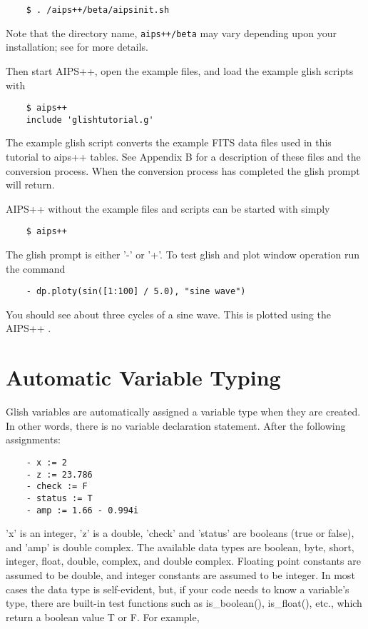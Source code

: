 \begin{verbatim}
	$ . /aips++/beta/aipsinit.sh
\end{verbatim}

Note that the directory name, \verb!aips++/beta!  may vary depending upon your
installation; see  for more details.

Then start AIPS++, open the example files, and load the example glish
scripts with

\begin{verbatim}
	$ aips++
	include 'glishtutorial.g'
\end{verbatim}
The example glish script converts the example FITS data files used
in this tutorial to aips++ tables.  See Appendix B for a description of
these files and the conversion process.  When the conversion process
has completed the glish prompt will return.

AIPS++ without the example files and scripts can be started with simply

\begin{verbatim}
	$ aips++
\end{verbatim}

The glish prompt is either '-' or '+'.  To test glish and plot window
operation run the command

\begin{verbatim}
	- dp.ploty(sin([1:100] / 5.0), "sine wave")
\end{verbatim}

You should see about three cycles of a sine wave. This is plotted
using the AIPS++ .

\section{Automatic Variable Typing}

    Glish variables are automatically assigned a variable type when they
are created.  In other words, there is no variable declaration statement.
After the following assignments:

\begin{verbatim}
	- x := 2
	- z := 23.786
	- check := F
	- status := T
	- amp := 1.66 - 0.994i
\end{verbatim}

'x' is an integer, 'z' is a double, 'check' and 'status' are booleans (true
or false), and 'amp' is double complex.  The available data types are
boolean, byte, short, integer, float, double, complex, and double complex.
Floating point constants are assumed to be double, and integer constants
are assumed to be integer.  In most cases the data type is self-evident,
but, if your code needs to know a variable's type, there are built-in test
functions such as is\_boolean(), is\_float(), etc., which return a boolean
value T or F.  For example,

